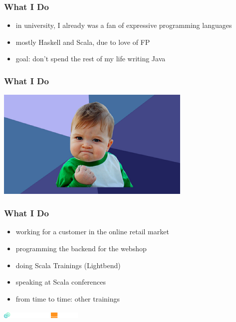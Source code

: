 \documentclass{beamer}
\begin{document}
\begin{frame}
  \frametitle{What I Do}
  \begin{itemize}
  \item in university, I already was a fan of expressive programming
    languages
  \item mostly Haskell and Scala, due to love of FP
  \item goal: don't spend the rest of my life writing Java
  \end{itemize}
\end{frame}

\begin{frame}
  \frametitle{What I Do}
  \begin{center}
    \includegraphics[width=0.7\textwidth]{pics/success.jpg}
  \end{center}
\end{frame}

\begin{frame}
  \frametitle{What I Do}
  \begin{itemize}
  \item working for a customer in the online retail market
  \item programming the backend for the webshop
  \item doing Scala Trainings (Lightbend)
  \item speaking at Scala conferences
  \item from time to time: other trainings
  \end{itemize}
  \vfill{}
  \includegraphics[height=3mm]{pics/codecentric-logo.png}
  \hfill{}
  \includegraphics[height=3mm]{pics/lightbend}
\end{frame}
\end{document}
